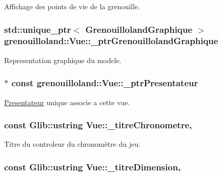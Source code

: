 Affichage des points de vie de la grenouille. \hypertarget{classgrenouilloland_1_1Vue_a998feee5bed8136f999d2e3484d0c6ca}{
\subsubsection[{\-\_\-ptr\-Grenouilloland\-Graphique}]{\setlength{\rightskip}{0pt plus 5cm}std\-::unique\-\_\-ptr$<$ {\bf Grenouilloland\-Graphique} $>$ grenouilloland\-::\-Vue\-::\-\_\-ptr\-Grenouilloland\-Graphique\hspace{0.3cm}{\ttfamily [protected]}}}\label{classgrenouilloland_1_1Vue_a998feee5bed8136f999d2e3484d0c6ca}
Representation graphique du modele. \hypertarget{classgrenouilloland_1_1Vue_a18b21aec8d74287eb28374399827c022}{
\subsubsection[{\-\_\-ptr\-Presentateur}]{$\ast$ const grenouilloland\-::\-Vue\-::\-\_\-ptr\-Presentateur\hspace{0.3cm}{\ttfamily [protected]}}}\label{classgrenouilloland_1_1Vue_a18b21aec8d74287eb28374399827c022}
\hyperlink{classgrenouilloland_1_1Presentateur}{Presentateur} unique associe a cette vue. \hypertarget{classgrenouilloland_1_1Vue_af6206813ed4886372538752ddbaa746c}{
\subsubsection[{\-\_\-titre\-Chronometre}]{\setlength{\rightskip}{0pt plus 5cm}const Glib\-::ustring Vue\-::\-\_\-titre\-Chronometre\hspace{0.3cm}{\ttfamily [static]}, {\ttfamily [protected]}}}\label{classgrenouilloland_1_1Vue_af6206813ed4886372538752ddbaa746c}
Titre du controleur du chronomètre du jeu. \hypertarget{classgrenouilloland_1_1Vue_a233d73dd3c303194933f0da4d3749efe}{
\subsubsection[{\-\_\-titre\-Dimension}]{\setlength{\rightskip}{0pt plus 5cm}const Glib\-::ustring Vue\-::\-\_\-titre\-Dimension\hspace{0.3cm}{\ttfamily [static]}, {\ttfamily [protected]}}}\label{classgrenouilloland_1_1Vue_a233d73dd3c303194933f0da4d3749efe}

